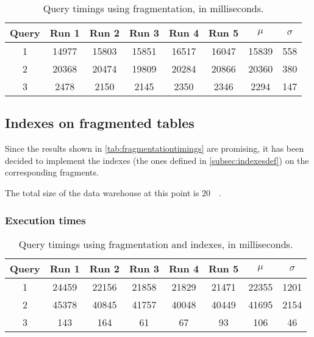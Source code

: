 \begin{table}[!h]
\centering
\begin{tabular}{|| c | c c c c c | c c ||} 
 \hline
 Query & Run 1 & Run 2 & Run 3 & Run 4 & Run 5 & 	$\mu$ & $\sigma$ \\ [0.5ex] 
 \hline\hline
 1 & 14977 & 15803 & 15851 & 16517 & 16047 & 15839 & 558 \\ 
 \hline
 2 & 20368 & 20474 & 19809 & 20284 & 20866 & 20360 & 380 \\
 \hline
 3 & 2478 & 2150 & 2145 & 2350 & 2346 & 2294 & 147 \\
 \hline
\end{tabular}
  \caption{Query timings using fragmentation, in milliseconds.}
  \label{tab:fragmentationtimings}
\end{table}



\subsection{Indexes on fragmented tables}

Since the results shown in \autoref{tab:fragmentationtimings} are promising, it has been decided to implement the indexes (the ones defined in \autoref{subsec:indexesdef}) on the corresponding fragments.

The total size of the data warehouse at this point is \SI{20}{\giga\byte}.


\subsubsection{Execution times}


\begin{table}[!h]
\centering
\begin{tabular}{|| c | c c c c c | c c ||} 
 \hline
 Query & Run 1 & Run 2 & Run 3 & Run 4 & Run 5 & 	$\mu$ & $\sigma$ \\ [0.5ex] 
 \hline\hline
 1 & 24459 & 22156 & 21858 & 21829 & 21471 & 22355 & 1201 \\ 
 \hline
 2 & 45378 & 40845 & 41757 & 40048 & 40449 & 41695 & 2154 \\
 \hline
 3 & 143 & 164 & 61 & 67 & 93 & 106 & 46 \\
 \hline
\end{tabular}
  \caption{Query timings using fragmentation and indexes, in milliseconds.}
  \label{tab:fragmentationindexestimings}
\end{table}